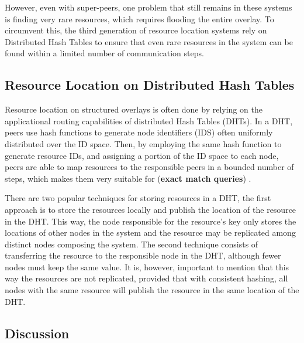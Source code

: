 However, even with super-peers, one problem that still remains in these systems is finding very rare resources, which requires flooding the entire overlay. To circumvent this, the third generation of resource location systems rely on Distributed Hash Tables to ensure that even rare resources in the system can be found within a limited number of communication steps.

\subsection{Resource Location on Distributed Hash Tables}

Resource location on structured overlays is often done by relying on the applicational routing capabilities of distributed Hash Tables (DHTs). In a DHT, peers use hash functions to generate node identifiers (IDS) often uniformly distributed over the ID space. Then, by employing the same hash function to generate resource IDs, and assigning a portion of the ID space to each node, peers are able to map resources to the responsible peers in a bounded number of steps, which makes them very suitable for (\textbf{exact match queries}) \cite{leitaoPHDthesis}. 


There are two popular techniques for storing resources in a DHT, the first approach is to store the resources locally and publish the location of the resource in the DHT. This way, the node responsible for the resource's key only stores the locations of other nodes in the system and the resource may be replicated among distinct nodes composing the system. The second technique consists of transferring the resource to the responsible node in the DHT, although fewer nodes must keep the same value. It is, however, important to mention that this way the resources are not replicated, provided that with consistent hashing, all nodes with the same resource will publish the resource in the same location of the DHT.

\subsection{Discussion}

